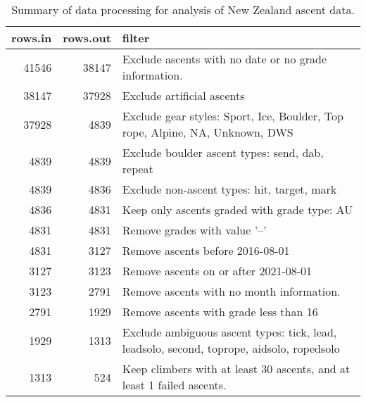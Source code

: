 \begin{table}[ht]
\centering
\begingroup\fontsize{9pt}{10pt}\selectfont
\begin{tabular}{rrl}
  \hline
{\bf rows.in} & {\bf rows.out} & {\bf filter} \\ 
  \hline
41546 & 38147 & Exclude ascents with no date or no grade information. \\ 
  38147 & 37928 & Exclude artificial ascents \\ 
  37928 & 4839 & Exclude gear styles: Sport, Ice, Boulder, Top rope, Alpine, NA, Unknown, DWS \\ 
  4839 & 4839 & Exclude boulder ascent types: send, dab, repeat \\ 
  4839 & 4836 & Exclude non-ascent types: hit, target, mark \\ 
  4836 & 4831 & Keep only ascents graded with grade type: AU \\ 
  4831 & 4831 & Remove grades with value '--' \\ 
  4831 & 3127 & Remove ascents before 2016-08-01 \\ 
  3127 & 3123 & Remove ascents on or after 2021-08-01 \\ 
  3123 & 2791 & Remove ascents with no month information. \\ 
  2791 & 1929 & Remove ascents with grade less than 16 \\ 
  1929 & 1313 & Exclude ambiguous ascent types: tick, lead, leadsolo, second, toprope, aidsolo, ropedsolo \\ 
  1313 & 524 & Keep climbers with at least 30 ascents, and at least 1 failed ascents. \\ 
   \hline
\end{tabular}
\endgroup
\caption{Summary of data processing for analysis of New Zealand ascent data.} 
\label{table-data-processing-nz}
\end{table}
